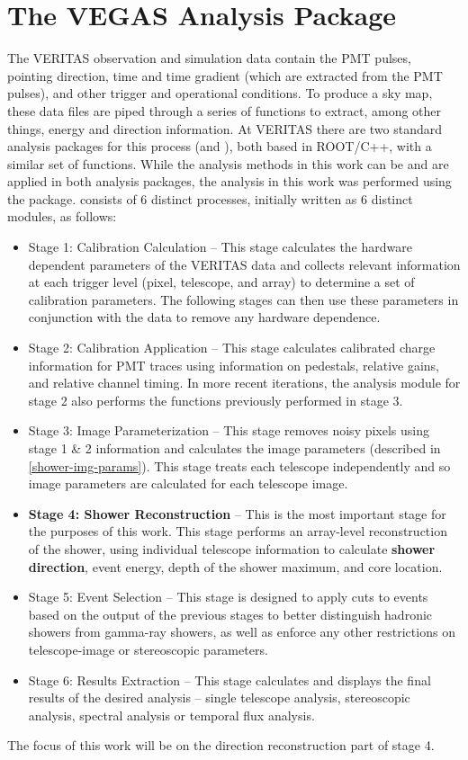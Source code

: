 \documentclass[main.tex]{subfiles}
\begin{document}
\section{The VEGAS Analysis Package}
The VERITAS observation and simulation data contain the PMT pulses, pointing direction, time and time gradient (which are extracted from the PMT pulses), and other trigger and operational conditions. To produce a sky map, these data files are piped through a series of functions to extract, among other things, energy and direction information. At VERITAS there are two standard analysis packages for this process (\vegas  and \ed), both based in ROOT/C++, with a similar set of functions. While the analysis methods in this work can be and are applied in both analysis packages, the analysis in this work was performed using the \vegas package.
\vegas consists of 6 distinct processes, initially written as 6 distinct modules, as follows:
\begin{itemize}
\item Stage 1: Calibration Calculation -- This stage calculates the hardware dependent parameters of the VERITAS data and collects relevant information at each trigger level (pixel, telescope, and array) to determine a set of calibration parameters. The following stages can then use these parameters in conjunction with the data to remove any hardware dependence.
\item Stage 2: Calibration Application -- This stage calculates calibrated charge information for PMT traces using information on pedestals, relative gains, and relative channel timing. In more recent iterations, the analysis module for stage 2 also performs the functions previously performed in stage 3. 
\item Stage 3: Image Parameterization -- This stage removes noisy pixels using stage 1 \& 2 information and calculates the image parameters (described in \ref{shower-img-params}). This stage treats each telescope independently and so image parameters are calculated for each telescope image.
\item \textbf{Stage 4: Shower Reconstruction} -- This is the most important stage for the purposes of this work. This stage performs an array-level reconstruction of the shower, using individual telescope information to calculate \textbf{shower direction}, event energy, depth of the shower maximum, and core location.
\item Stage 5: Event Selection -- This stage is designed to apply cuts to events based on the output of the previous stages to better distinguish hadronic showers from gamma-ray showers, as well as enforce any other restrictions on telescope-image or stereoscopic parameters.
\item Stage 6: Results Extraction -- This stage calculates and displays the final results of the desired analysis -- single telescope analysis, stereoscopic analysis, spectral analysis or temporal flux analysis.
\end{itemize}
The focus of this work will be on the direction reconstruction part of stage 4.
\end{document}

